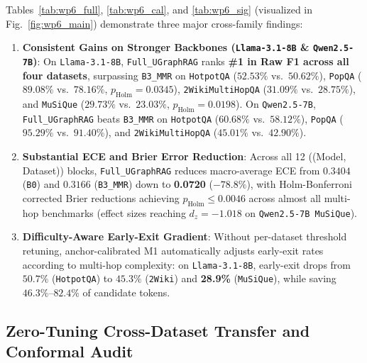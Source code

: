 \documentclass[11pt]{article}
\begin{document}
Tables~\ref{tab:wp6_full}, \ref{tab:wp6_cal}, and \ref{tab:wp6_sig} (visualized in Fig.~\ref{fig:wp6_main}) demonstrate three major cross-family findings:
\begin{enumerate}[leftmargin=*,nosep]
    \item \textbf{Consistent Gains on Stronger Backbones (\texttt{Llama-3.1-8B} \& \texttt{Qwen2.5-7B})}: On \texttt{Llama-3.1-8B}, \texttt{Full\_UGraphRAG} ranks \textbf{\#1 in Raw F1 across all four datasets}, surpassing \texttt{B3\_MMR} on \texttt{HotpotQA} ($52.53\%$ vs.\ $50.62\%$), \texttt{PopQA} ($89.08\%$ vs.\ $78.16\%$, $p_{\text{Holm}}=0.0345$), \texttt{2WikiMultiHopQA} ($31.09\%$ vs.\ $28.75\%$), and \texttt{MuSiQue} ($29.73\%$ vs.\ $23.03\%$, $p_{\text{Holm}}=0.0198$). On \texttt{Qwen2.5-7B}, \texttt{Full\_UGraphRAG} beats \texttt{B3\_MMR} on \texttt{HotpotQA} ($60.68\%$ vs.\ $58.12\%$), \texttt{PopQA} ($95.29\%$ vs.\ $91.40\%$), and \texttt{2WikiMultiHopQA} ($45.01\%$ vs.\ $42.90\%$).
    \item \textbf{Substantial ECE and Brier Error Reduction}: Across all 12 ((Model, Dataset)) blocks, \texttt{Full\_UGraphRAG} reduces macro-average ECE from $0.3404$ (\texttt{B0}) and $0.3166$ (\texttt{B3\_MMR}) down to \textbf{0.0720} ($-78.8\%$), with Holm-Bonferroni corrected Brier reductions achieving $p_{\text{Holm}} \le 0.0046$ across almost all multi-hop benchmarks (effect sizes reaching $d_z = -1.018$ on \texttt{Qwen2.5-7B MuSiQue}).
    \item \textbf{Difficulty-Aware Early-Exit Gradient}: Without per-dataset threshold retuning, anchor-calibrated M1 automatically adjusts early-exit rates according to multi-hop complexity: on \texttt{Llama-3.1-8B}, early-exit drops from $50.7\%$ (\texttt{HotpotQA}) to $45.3\%$ (\texttt{2Wiki}) and \textbf{28.9\%} (\texttt{MuSiQue}), while saving $46.3\%\text{--}82.4\%$ of candidate tokens.
\end{enumerate}

\subsection{Zero-Tuning Cross-Dataset Transfer and Conformal Audit}
\end{document}
